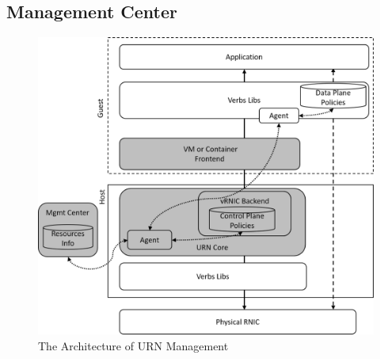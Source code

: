 

\subsection{Management Center}




\begin{figure}[!ht]
	\centering
	\includegraphics[width=1\linewidth]{images/urn-interface.png}
	\caption{The Architecture of URN Management}
	\label{fig:route-config}
\end{figure}

